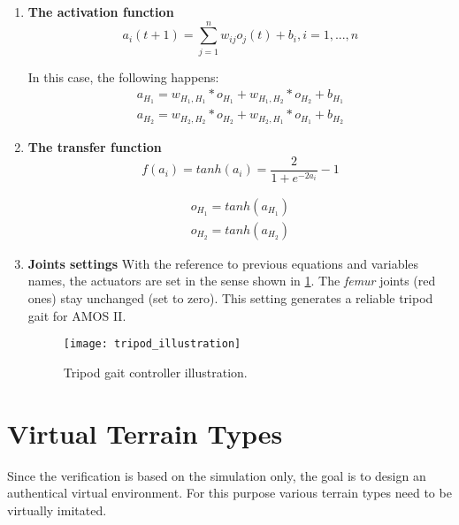 \begin{enumerate}
\item \textbf{The activation function}
\begin{equation}
a_i(t+1) = \displaystyle\sum_{j=1}^{n} w_{ij}o_j(t) + b_i, i = 1, ..., n
\end{equation}

In this case, the following happens:
\begin{equation}
\begin{split}
a_{H_1} = w_{H_1,H_1} * o_{H_1} + w_{H_1,H_2} * o_{H_2} + b_{H_1} \\
a_{H_2} = w_{H_2,H_2} * o_{H_2} + w_{H_2,H_1} * o_{H_1} + b_{H_2}
\end{split}
\end{equation}

\item \textbf{The transfer function}
\begin{equation}
f(a_i) = tanh(a_i) = \frac{2}{1+e^{-2a_i}} - 1
\end{equation}

\begin{equation}
\begin{split}
o_{H_1} = tanh(a_{H_1}) \\
o_{H_2} = tanh(a_{H_2})
\end{split}
\end{equation}

\item \textbf{Joints settings}
With the reference to previous equations and variables names, the actuators are set in the sense shown in \cref{img:tripod_illustration}. The \textit{femur} joints (red ones) stay unchanged (set to zero). This setting generates a reliable tripod gait for AMOS II.

\begin{figure}[H]
  \centering
  \texttt{[image: tripod\_illustration]}
  \caption{Tripod gait controller illustration.}
  \label{img:tripod_illustration}
\end{figure}
\end{enumerate}

\section{Virtual Terrain Types} \label{sec:virtual_terrain_types}
Since the verification is based on the simulation only, the goal is to design an authentical virtual environment. For this purpose various terrain types need to be virtually imitated.


